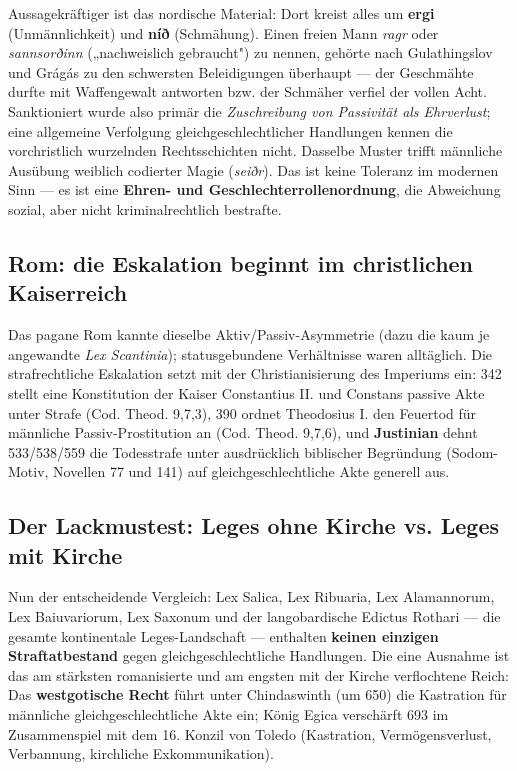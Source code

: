 \documentclass[11pt,a4paper,ngerman]{scrartcl}
\newcommand{\chipbase}[2]{\hspace{0pt}{\footnotesize\textcolor{#1}{[\textsc{#2}]}}}
\newcommand{\chipbelegt}[1]{\chipbase{chipgreen}{#1}}
\newcommand{\chipplausibel}[1]{\chipbase{chipamber}{#1}}
\begin{document}
Aussagekräftiger ist das nordische Material: Dort kreist alles um \textbf{ergi} (Unmännlichkeit) und \textbf{níð} (Schmähung). Einen freien Mann \emph{ragr} oder \emph{sannsorðinn} („nachweislich gebraucht") zu nennen, gehörte nach Gulathingslov und Grágás zu den schwersten Beleidigungen überhaupt — der Geschmähte durfte mit Waffengewalt antworten bzw. der Schmäher verfiel der vollen Acht. Sanktioniert wurde also primär die \emph{Zuschreibung von Passivität als Ehrverlust}; eine allgemeine Verfolgung gleichgeschlechtlicher Handlungen kennen die vorchristlich wurzelnden Rechtsschichten nicht. Dasselbe Muster trifft männliche Ausübung weiblich codierter Magie (\emph{seiðr}). \chipbelegt{belegt} Das ist keine Toleranz im modernen Sinn — es ist eine \textbf{Ehren- und Geschlechterrollenordnung}, die Abweichung sozial, aber nicht kriminalrechtlich bestrafte. \chipplausibel{plausibel}

\subsection*{Rom: die Eskalation beginnt im christlichen Kaiserreich}

Das pagane Rom kannte dieselbe Aktiv/Passiv-Asymmetrie (dazu die kaum je angewandte \emph{Lex Scantinia}); statusgebundene Verhältnisse waren alltäglich. Die strafrechtliche Eskalation setzt mit der Christianisierung des Imperiums ein: 342 stellt eine Konstitution der Kaiser Constantius II. und Constans passive Akte unter Strafe (Cod. Theod. 9,7,3), 390 ordnet Theodosius I. den Feuertod für männliche Passiv-Prostitution an (Cod. Theod. 9,7,6), und \textbf{Justinian} dehnt 533/538/559 die Todesstrafe unter ausdrücklich biblischer Begründung (Sodom-Motiv, Novellen 77 und 141) auf gleichgeschlechtliche Akte generell aus. \chipbelegt{belegt}

\subsection*{Der Lackmustest: Leges ohne Kirche vs. Leges mit Kirche}

Nun der entscheidende Vergleich: Lex Salica, Lex Ribuaria, Lex Alamannorum, Lex Baiuvariorum, Lex Saxonum und der langobardische Edictus Rothari — die gesamte kontinentale Leges-Landschaft — enthalten \textbf{keinen einzigen Straftatbestand} gegen gleichgeschlechtliche Handlungen. \chipbelegt{belegt} Die eine Ausnahme ist das am stärksten romanisierte und am engsten mit der Kirche verflochtene Reich: Das \textbf{westgotische Recht} führt unter Chindaswinth (um 650) die Kastration für männliche gleichgeschlechtliche Akte ein; König Egica verschärft 693 im Zusammenspiel mit dem 16. Konzil von Toledo (Kastration, Vermögensverlust, Verbannung, kirchliche Exkommunikation). \chipbelegt{belegt}
\end{document}
